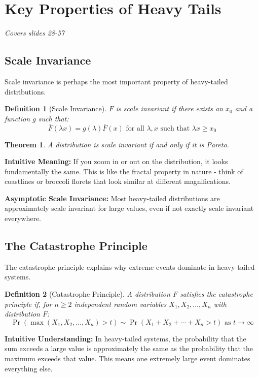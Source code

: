 \documentclass[11pt]{article}
\newtheorem{definition}{Definition}
\newtheorem{theorem}{Theorem}
\begin{document}
\section{Key Properties of Heavy Tails}
\textit{Covers slides 28-57}

\subsection{Scale Invariance}

Scale invariance is perhaps the most important property of heavy-tailed distributions.

\begin{definition}[Scale Invariance]
$F$ is scale invariant if there exists an $x_0$ and a function $g$ such that:
$$\bar{F}(\lambda x) = g(\lambda)\bar{F}(x) \text{ for all } \lambda, x \text{ such that } \lambda x \geq x_0$$
\end{definition}

\begin{theorem}
A distribution is scale invariant if and only if it is Pareto.
\end{theorem}

\textbf{Intuitive Meaning:} If you zoom in or out on the distribution, it looks fundamentally the same. This is like the fractal property in nature - think of coastlines or broccoli florets that look similar at different magnifications.

\textbf{Asymptotic Scale Invariance:} Most heavy-tailed distributions are approximately scale invariant for large values, even if not exactly scale invariant everywhere.

\subsection{The Catastrophe Principle}

The catastrophe principle explains why extreme events dominate in heavy-tailed systems.

\begin{definition}[Catastrophe Principle]
A distribution $F$ satisfies the catastrophe principle if, for $n \geq 2$ independent random variables $X_1, X_2, \ldots, X_n$ with distribution $F$:
$$\Pr(\max(X_1, X_2, \ldots, X_n) > t) \sim \Pr(X_1 + X_2 + \cdots + X_n > t) \text{ as } t \to \infty$$
\end{definition}

\textbf{Intuitive Understanding:} In heavy-tailed systems, the probability that the sum exceeds a large value is approximately the same as the probability that the maximum exceeds that value. This means one extremely large event dominates everything else.
\end{document}

